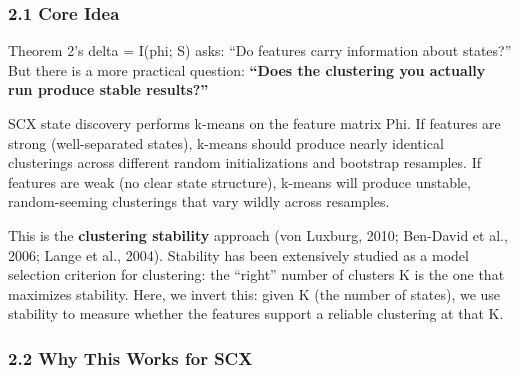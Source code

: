 \documentclass[
  12pt,
]{ctexart}
\begin{document}
\subsubsection{2.1 Core Idea}\label{core-idea}

Theorem 2's delta = I(phi; S) asks: ``Do features carry information
about states?'' But there is a more practical question: \textbf{``Does
the clustering you actually run produce stable results?''}

SCX state discovery performs k-means on the feature matrix Phi. If
features are strong (well-separated states), k-means should produce
nearly identical clusterings across different random initializations and
bootstrap resamples. If features are weak (no clear state structure),
k-means will produce unstable, random-seeming clusterings that vary
wildly across resamples.

This is the \textbf{clustering stability} approach (von Luxburg, 2010;
Ben-David et al., 2006; Lange et al., 2004). Stability has been
extensively studied as a model selection criterion for clustering: the
``right'' number of clusters K is the one that maximizes stability.
Here, we invert this: given K (the number of states), we use stability
to measure whether the features support a reliable clustering at that K.

\subsubsection{2.2 Why This Works for SCX}\label{why-this-works-for-scx}
\end{document}
